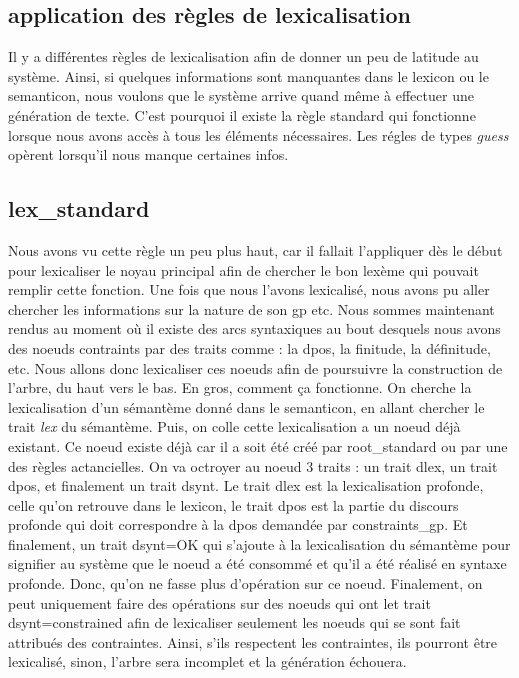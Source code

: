 \subsection{application des règles de lexicalisation}

Il y a différentes règles de lexicalisation afin de donner un peu de latitude au système. Ainsi, si quelques informations sont manquantes dans le lexicon ou le semanticon, nous voulons que le système arrive quand même à effectuer une génération de texte. C'est pourquoi il existe la règle standard qui fonctionne lorsque nous avons accès à tous les éléments nécessaires. Les régles de types \emph{guess} opèrent lorsqu'il nous manque certaines infos. 

\subsection{lex{\_}standard}

Nous avons vu cette règle un peu plus haut, car il fallait l'appliquer dès le début pour lexicaliser le noyau principal afin de chercher le bon lexème qui pouvait remplir cette fonction. Une fois que nous l'avons lexicalisé, nous avons pu aller chercher les informations sur la nature de son gp etc. Nous sommes maintenant rendus au moment où il existe des arcs syntaxiques au bout desquels nous avons des noeuds contraints par des traits comme : la dpos, la finitude, la définitude, etc. Nous allons donc lexicaliser ces noeuds afin de poursuivre la construction de l'arbre, du haut vers le bas. En gros, comment ça fonctionne. On cherche la lexicalisation d'un sémantème donné dans le semanticon, en allant chercher le trait \emph{lex} du sémantème. Puis, on colle cette lexicalisation a un noeud déjà existant. Ce noeud existe déjà car il a soit été créé par root{\_}standard ou par une des règles actancielles. On va octroyer au noeud 3 traits : un trait dlex, un trait dpos, et finalement un trait dsynt. Le trait dlex est la lexicalisation profonde, celle qu'on retrouve dans le lexicon, le trait dpos est la partie du discours profonde qui doit correspondre à la dpos demandée par constraints{\_}gp. Et finalement, un trait dsynt=OK qui s'ajoute à la lexicalisation du sémantème pour signifier au système que le noeud a été consommé et qu'il a été réalisé en syntaxe profonde. Donc, qu'on ne fasse plus d'opération sur ce noeud. Finalement, on peut uniquement faire des opérations sur des noeuds qui ont let trait dsynt=constrained afin de lexicaliser seulement les noeuds qui se sont fait attribués des contraintes. Ainsi, s'ils respectent les contraintes, ils pourront être lexicalisé, sinon, l'arbre sera incomplet et la génération échouera.

